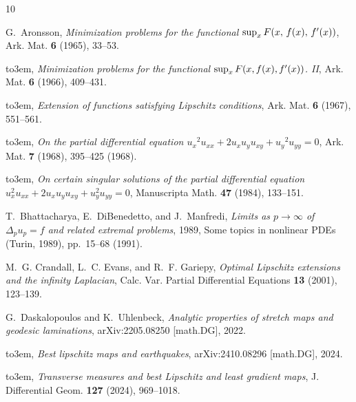 \documentclass[a4paper]{article}
\theoremstyle{definition}
\theoremstyle{remark}
\begin{document}
\def\cprime{$'$}
\providecommand{\bysame}{\leavevmode\hbox to3em{\hrulefill}\thinspace}
\providecommand{\MR}{\relax\ifhmode\unskip\space\fi MR }
\providecommand{\MRhref}[2]{%
  \href{http://www.ams.org/mathscinet-getitem?mr=#1}{#2}
}
\providecommand{\href}[2]{#2}
\begin{thebibliography}{10}

G.~Aronsson, \emph{Minimization problems for the functional {${\rm
  sup}_{x}\,F(x,\,f(x),\,f^{\prime} (x))$}}, Ark. Mat. \textbf{6} (1965),
  33--53.

\bysame, \emph{Minimization problems for the functional {${\rm sup}_{x}\, F(x,
  f(x),f\sp\prime (x))$}. {II}}, Ark. Mat. \textbf{6} (1966), 409--431.

\bysame, \emph{Extension of functions satisfying {L}ipschitz conditions}, Ark.
  Mat. \textbf{6} (1967), 551--561.

\bysame, \emph{On the partial differential equation
  {$u_{x}{}^{2}\!u_{xx}+2u_{x}u_{y}u_{xy}+u_{y}{}^{2}\!u_{yy}=0$}}, Ark. Mat.
  \textbf{7} (1968), 395--425 (1968).

\bysame, \emph{On certain singular solutions of the partial differential
  equation {$u^{2}_{x}u_{xx}+2u_{x}u_{y}u_{xy}+u^{2}_{y}u_{yy}=0$}},
  Manuscripta Math. \textbf{47} (1984), 133--151.

T.~Bhattacharya, E.~DiBenedetto, and J.~Manfredi, \emph{Limits as
  {$p\to\infty$} of {$\Delta_pu_p=f$} and related extremal problems}, 1989,
  Some topics in nonlinear PDEs (Turin, 1989), pp.~15--68 (1991).

M.~G. Crandall, L.~C. Evans, and R.~F. Gariepy, \emph{Optimal {L}ipschitz
  extensions and the infinity {L}aplacian}, Calc. Var. Partial Differential
  Equations \textbf{13} (2001), 123--139.

G.~Daskalopoulos and K.~Uhlenbeck, \emph{Analytic properties of stretch maps
  and geodesic laminations}, arXiv:2205.08250 [math.DG], 2022.

\bysame, \emph{Best lipschitz maps and earthquakes}, arXiv:2410.08296
  [math.DG], 2024.

\bysame, \emph{Transverse measures and best {L}ipschitz and least gradient
  maps}, J. Differential Geom. \textbf{127} (2024), 969--1018.


\end{thebibliography}
\end{document}
